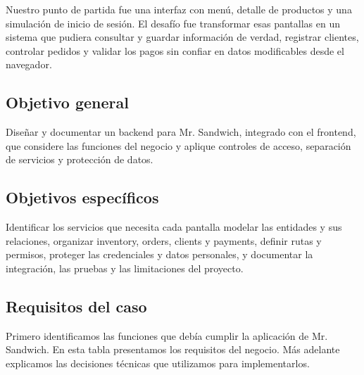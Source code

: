 \documentclass[10pt,letterpaper]{article}
\begin{document}
Nuestro punto de partida fue una interfaz con menú, detalle de productos y una simulación de inicio de sesión. El desafío fue transformar esas pantallas en un sistema que pudiera consultar y guardar información de verdad, registrar clientes, controlar pedidos y validar los pagos sin confiar en datos modificables desde el navegador.


\subsection*{Objetivo general}
Diseñar y documentar un backend para Mr. Sandwich, integrado con el frontend, que considere las funciones del negocio y aplique controles de acceso, separación de servicios y protección de datos.


\subsection*{Objetivos específicos}
Identificar los servicios que necesita cada pantalla modelar las entidades y sus relaciones, organizar inventory, orders, clients y payments, definir rutas y permisos, proteger las credenciales y datos personales, y documentar la integración, las pruebas y las limitaciones del proyecto.


\subsection*{Requisitos del caso}
Primero identificamos las funciones que debía cumplir la aplicación de Mr. Sandwich. En esta tabla presentamos los requisitos del negocio. Más adelante explicamos las decisiones técnicas que utilizamos para implementarlos.
\end{document}

